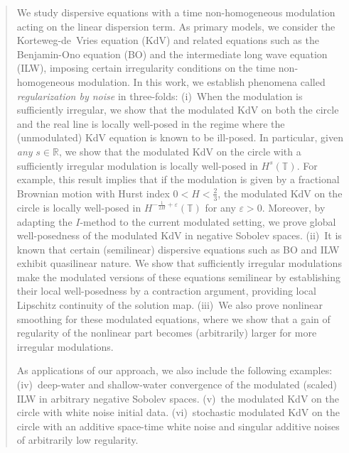 \documentclass[letterpaper, 11pt,  reqno]{amsart}
\newcommand{\1}{\hspace{0.5mm}\text{I}\hspace{0.5mm}}
\numberwithin{equation}{section}
\numberwithin{theorem}{section}
\begin{document}
 










\begin{abstract}


We study dispersive equations with a time non-homogeneous modulation acting on the linear dispersion term. As  primary models, we consider the Korteweg-de~Vries equation (KdV) and related equations such as the Benjamin-Ono equation (BO) and the intermediate long wave equation (ILW), imposing certain irregularity conditions on the time non-homogeneous modulation. In this work, we establish phenomena called {\it regularization by noise} in three-folds: (i)~When the modulation is sufficiently irregular, we show that the modulated KdV on both the circle and the real line is locally well-posed in the regime where the (unmodulated) KdV equation is known to be ill-posed. In particular, given {\it any} $s \in \mathbb R$, we show that the modulated KdV on the circle with a sufficiently irregular modulation is locally well-posed in $H^s(\mathbb T)$. For example, this result implies that if the modulation is given by a fractional Brownian motion with Hurst index $0 < H < \frac 23$, the modulated KdV on the circle is locally well-posed in $H^{-\frac{1}{2H}+\varepsilon}(\mathbb{T})$ for any $\varepsilon > 0$. Moreover, by adapting the $I$-method to the current modulated setting, we prove global well-posedness of the modulated KdV in negative Sobolev spaces. (ii)~It is known that certain (semilinear) dispersive equations such as BO and ILW exhibit  quasilinear nature. We show that sufficiently irregular modulations make the modulated versions of these equations semilinear by establishing their local well-posedness by a contraction argument, providing local Lipschitz continuity of the solution map. (iii)~We also prove nonlinear smoothing for these modulated equations, where we show that a gain of regularity of the nonlinear part becomes (arbitrarily) larger for more irregular modulations.

As applications of our approach, we also include the following examples: (iv)~deep-water and shallow-water convergence of the modulated (scaled) ILW in arbitrary negative Sobolev spaces. (v)~the modulated KdV on the circle with white noise initial data. (vi)~stochastic modulated KdV on the circle with an additive space-time white noise and singular additive noises of arbitrarily low regularity.











\end{abstract}
\end{document}
